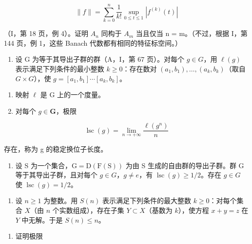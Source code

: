 \[
\| f \| = \sum_ {k = 0} ^ {n} \frac {1}{k !} \sup _ {0 \leqslant t \leqslant 1} | f ^ {(k)} (t) |
\]

（I，第 18 页，例 4）。证明 \(A_{n}\) 同构于 \(A_{m}\) 当且仅当 n = m。（不过，根据 I，第 144 页，例 1，这些 Banach 代数都有相同的特征标空间。）

\begin{enumerate}
\def\labelenumi{\arabic{enumi})}
\setcounter{enumi}{2}
\tightlist
\item
  设 G 为等于其导出子群的群（A，I，第 67 页）。对每个 \(g \in G\)，用 \(\ell(g)\) 表示满足下列条件的最小整数 \(k \geqslant 0\)：存在数对 \((a_{1}, b_{1}), \ldots, (a_{k}, b_{k})\)（取自 \(G \times G\)），使 \(g = [a_{1}, b_{1}] \cdots [a_{k}, b_{k}]\)。
\end{enumerate}

\begin{enumerate}
\def\labelenumi{\alph{enumi})}
\item
  映射 \(\ell\) 是 G 上的一个度量。
\item
  对每个 \(g \in \mathbf{G}\)，极限
\end{enumerate}

\[
\operatorname{lsc} (g) = \lim _ {n \to + \infty} \frac {\ell (g ^ {n})}{n}
\]

存在，称为 g 的稳定换位子长度。

\begin{enumerate}
\def\labelenumi{\alph{enumi})}
\setcounter{enumi}{2}
\tightlist
\item
  设 S 为一个集合，\(\mathrm{G} = \mathrm{D}(\mathrm{F}(\mathrm{S}))\) 为由 S 生成的自由群的导出子群。群 G 等于其导出子群，且对每个 \(g \in G\)，\(g \neq e\)，有 \(\operatorname{lsc}(g) \geqslant 1/2\)。存在 \(g \in G\) 使 \(\operatorname{lsc}(g) = 1/2\)。
\end{enumerate}

\begin{enumerate}
\def\labelenumi{\arabic{enumi})}
\setcounter{enumi}{3}
\tightlist
\item
  设 \(n \geqslant 1\) 为整数。用 \(S(n)\) 表示满足下列条件的最大整数 \(k \geqslant 0\)：对每个集合 \(X\)（由 \(n\) 个实数组成），存在子集 \(Y \subset X\)（基数为 \(k\)），使方程 \(x + y = z\) 在 \(Y\) 中无解。于是 \(S(n) \leqslant n\)。
\end{enumerate}

\begin{enumerate}
\def\labelenumi{\alph{enumi})}
\tightlist
\item
  证明极限
\end{enumerate}

